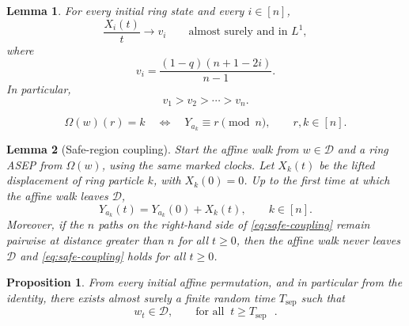 \documentclass[10pt,a4paper]{amsart}
\newtheorem{lemma}{Lemma}
\newtheorem{proposition}{Proposition}
\newcommand{\cD}{\mathcal D}
\begin{document}
	\begin{lemma}\label{lem:ring-velocity}
		For every initial ring state and every $i\in[n]$,
		\begin{equation}\label{eq:ring-velocity-lln}
			\frac{X_i(t)}{t}\longrightarrow v_i
			\qquad\text{almost surely and in }L^1,
		\end{equation}
		where
		\begin{equation}\label{eq:ring-velocities}
			v_i=\frac{(1-q)(n+1-2i)}{n-1}.
		\end{equation}
		In particular,
		\begin{equation}\label{eq:strict-velocity-order}
			v_1>v_2>\cdots>v_n.
		\end{equation}
	\end{lemma}

	\begin{equation}\label{eq:safe-ring-word}
		\Omega(w)(r)=k
		\quad\Longleftrightarrow\quad
		Y_{a_k}\equiv r\pmod n,
		\qquad r,k\in[n].
	\end{equation}

	\begin{lemma}[Safe-region coupling]\label{lem:safe-region-coupling}
		Start the affine walk from $w\in\cD$ and a ring ASEP from $\Omega(w)$, using
		the same marked clocks.  Let $X_k(t)$ be the lifted displacement of ring
		particle $k$, with $X_k(0)=0$.  Up to the first time at which the affine walk
		leaves $\cD$,
		\begin{equation}\label{eq:safe-coupling}
			Y_{a_k}(t)=Y_{a_k}(0)+X_k(t),
			\qquad k\in[n].
		\end{equation}
		Moreover, if the $n$ paths on the right-hand side of
		\eqref{eq:safe-coupling} remain pairwise at distance greater than $n$ for all
		$t\ge0$, then the affine walk never leaves $\cD$ and
		\eqref{eq:safe-coupling} holds for all $t\ge0$.
	\end{lemma}

	\begin{proposition}\label{prop:eventual-separation}
		From every initial affine permutation, and in particular from the identity,
		there exists almost surely a finite random time $T_\mathrm{sep}$ such that
		\begin{equation}\label{eq:eventual-safe-region}
			w_t\in\cD,
			\qquad \mbox{for all $\ t \ge T_\mathrm{sep}$ }.
		\end{equation}
	\end{proposition}
\end{document}
